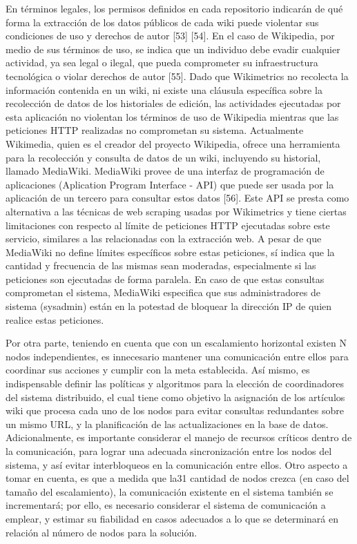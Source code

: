 En términos legales, los permisos definidos en cada repositorio indicarán de qué
forma la extracción de los datos públicos de cada wiki puede violentar sus condiciones
de uso y derechos de autor [53] [54]. En el caso de Wikipedia, por medio de sus
términos de uso, se indica que un individuo debe evadir cualquier actividad, ya sea legal
o ilegal, que pueda comprometer su infraestructura tecnológica o violar derechos de
autor [55]. Dado que Wikimetrics no recolecta la información contenida en un wiki, ni
existe una cláusula específica sobre la recolección de datos de los historiales de edición,
las actividades ejecutadas por esta aplicación no violentan los términos de uso de
Wikipedia mientras que las peticiones HTTP realizadas no comprometan su sistema.
Actualmente Wikimedia, quien es el creador del proyecto Wikipedia, ofrece una
herramienta para la recolección y consulta de datos de un wiki, incluyendo su historial,
llamado MediaWiki. MediaWiki provee de una interfaz de programación de aplicaciones
(Aplication Program Interface - API) que puede ser usada por la aplicación de un tercero
para consultar estos datos [56]. Este API se presta como alternativa a las técnicas de
web scraping usadas por Wikimetrics y tiene ciertas limitaciones con respecto al límite
de peticiones HTTP ejecutadas sobre este servicio, similares a las relacionadas con la
extracción web. A pesar de que MediaWiki no define límites específicos sobre estas
peticiones, sí indica que la cantidad y frecuencia de las mismas sean moderadas,
especialmente si las peticiones son ejecutadas de forma paralela. En caso de que estas
consultas comprometan el sistema, MediaWiki especifica que sus administradores de
sistema (sysadmin) están en la potestad de bloquear la dirección IP de quien realice
estas peticiones.

Por otra parte, teniendo en cuenta que con un escalamiento horizontal existen N
nodos independientes, es innecesario mantener una comunicación entre ellos para
coordinar sus acciones y cumplir con la meta establecida. Así mismo, es indispensable
definir las políticas y algoritmos para la elección de coordinadores del sistema
distribuido, el cual tiene como objetivo la asignación de los artículos wiki que procesa
cada uno de los nodos para evitar consultas redundantes sobre un mismo URL, y la
planificación de las actualizaciones en la base de datos. Adicionalmente, es importante
considerar el manejo de recursos críticos dentro de la comunicación, para lograr una
adecuada sincronización entre los nodos del sistema, y así evitar interbloqueos en la
comunicación entre ellos. Otro aspecto a tomar en cuenta, es que a medida que la31
cantidad de nodos crezca (en caso del tamaño del escalamiento), la comunicación
existente en el sistema también se incrementará; por ello, es necesario considerar el
sistema de comunicación a emplear, y estimar su fiabilidad en casos adecuados a lo que
se determinará en relación al número de nodos para la solución.

